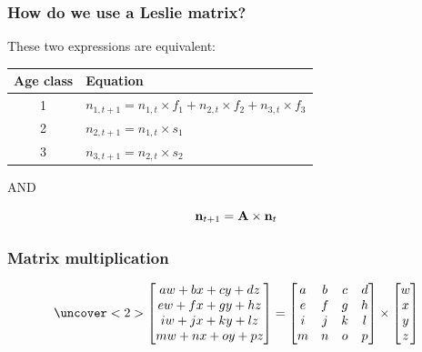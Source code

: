 \documentclass[color=usenames,dvipsnames]{beamer}\usepackage[]{graphicx}\usepackage[]{xcolor}
\begin{document}
\begin{frame}
  \frametitle{How do we use a Leslie matrix?}
  \large
  These two expressions are equivalent: \par
  \vspace{0.5cm}
  \begin{tabular}{cl}
    \hline
    Age class & Equation \\
    \hline
    1 & $n_{1,t+1} = n_{1,t} \times f_{1} + n_{2,t} \times f_{2} + n_{3,t} \times f_3$ \\
    2 & $n_{2,t+1} = n_{1,t} \times s_{1}$ \\
    3 & $n_{3,t+1} = n_{2,t} \times s_{2}$ \\
    \hline
  \end{tabular}
  \vfill
  {\centering AND \par}
  \vfill
  \[
    {\bf n}_{t+1} = {\bf A}\times {\bf n}_{t}
  \]
\end{frame}



\begin{frame}
  \frametitle{Matrix multiplication}
  \Large
  \begin{center}
    \[
    \uncover<2>{ %
    \begin{bmatrix}
      aw + bx + cy + dz \\
      ew + fx + gy + hz \\
      iw + jx + ky + lz \\
      mw + nx + oy + pz
    \end{bmatrix}
    } =
    \begin{bmatrix}
      a & b & c & d \\
      e & f & g & h \\
      i & j & k & l \\
      m & n & o & p
    \end{bmatrix}
    \times
    \begin{bmatrix}
      w \\
      x \\
      y \\
      z
    \end{bmatrix}
    \]
  \end{center}
\end{frame}
\end{document}
